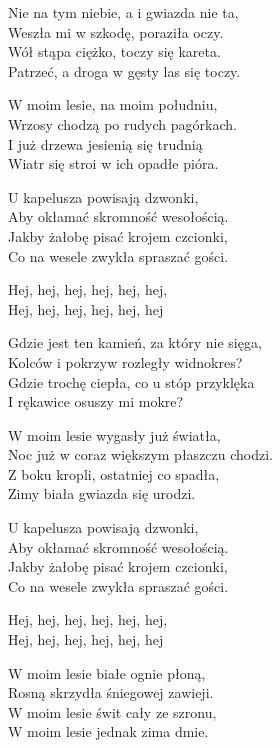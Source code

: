 \begin{text}
    Nie na tym niebie, a i gwiazda nie ta,\\
    Weszła mi w szkodę, poraziła oczy.\\
    Wół stąpa ciężko, toczy się kareta.\\
    Patrzeć, a droga w gęsty las się toczy.

    W moim lesie, na moim południu,\\
    Wrzosy chodzą po rudych pagórkach.\\
    I już drzewa jesienią się trudnią\\
    Wiatr się stroi w ich opadłe pióra.

    U kapelusza powisają dzwonki,\\
    Aby okłamać skromność wesołością.\\
    Jakby żałobę pisać krojem czcionki,\\
    Co na wesele zwykła spraszać gości.

    Hej, hej, hej, hej, hej, hej,\\
    Hej, hej, hej, hej, hej, hej

    Gdzie jest ten kamień, za który nie sięga,\\
    Kolców i pokrzyw rozległy widnokres?\\
    Gdzie trochę ciepła, co u stóp przyklęka\\
    I rękawice osuszy mi mokre?

    W moim lesie wygasły już światła,\\
    Noc już w coraz większym płaszczu chodzi.\\
    Z boku kropli, ostatniej co spadła,\\
    Zimy biała gwiazda się urodzi.

    U kapelusza powisają dzwonki,\\
    Aby okłamać skromność wesołością.\\
    Jakby żałobę pisać krojem czcionki,\\
    Co na wesele zwykła spraszać gości.

    Hej, hej, hej, hej, hej, hej,\\
    Hej, hej, hej, hej, hej, hej

    W moim lesie białe ognie płoną,\\
    Rosną skrzydła śniegowej zawieji.\\
    W moim lesie świt cały ze szronu,\\
    W moim lesie jednak zima dmie.
\end{text}
